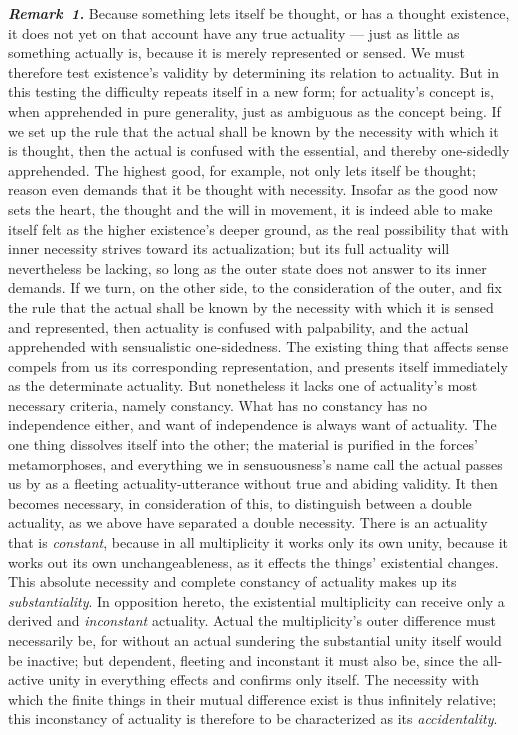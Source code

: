 \documentclass[12pt]{book}
\newcommand{\anm}[1]{\emph{\textbf{Remark~#1.}}}
\begin{document}
\anm{1} Because something lets itself be thought, or has a thought
existence, it does not yet on that account have any true actuality --- just
as little as something actually is, because it is merely represented or
sensed. We must therefore test existence's validity by determining its
relation to actuality. But in this testing the difficulty repeats itself in
a new form; for actuality's concept is, when apprehended in pure generality,
just as ambiguous as the concept being. If we set up the rule that the
actual shall be known by the necessity with which it is thought, then the
actual is confused with the essential, and thereby one-sidedly apprehended.
The highest good, for example, not only lets itself be thought; reason even
demands that it be thought with necessity. Insofar as the good now sets the
heart, the thought and the will in movement, it is indeed able to make
itself felt as the higher existence's deeper ground, as the real possibility
that with inner necessity strives toward its actualization; but its full
actuality will nevertheless be lacking, so long as the outer state does not
answer to its inner demands. If we turn, on the other side, to the
consideration of the outer, and fix the rule that the actual shall be known
by the necessity with which it is sensed and represented, then actuality is
confused with palpability, and the actual apprehended with sensualistic
one-sidedness. The existing thing that affects sense compels from us its
corresponding representation, and presents itself immediately as the
determinate actuality. But nonetheless it lacks one of actuality's most
necessary criteria, namely constancy. What has no constancy has no
independence either, and want of independence is always want of actuality.
The one thing dissolves itself into the other; the material is purified in
the forces' metamorphoses, and everything we in sensuousness's name call the
actual passes us by as a fleeting actuality-utterance without true and
abiding validity. It then becomes necessary, in consideration of this, to
distinguish between a double actuality, as we above have separated a double
necessity. There is an actuality that is \emph{constant}, because in all
multiplicity it works only its own unity, because it works out its own
unchangeableness, as it effects the things' existential changes. This
absolute necessity and complete constancy of actuality makes up its
\emph{substantiality}. In opposition hereto, the existential multiplicity
can receive only a derived and \emph{inconstant} actuality. Actual the
multiplicity's outer difference must necessarily be, for without an actual
sundering the substantial unity itself would be inactive; but dependent,
fleeting and inconstant it must also be, since the all-active unity in
everything effects and confirms only itself. The necessity with which the
finite things in their mutual difference exist is thus infinitely relative;
this inconstancy of actuality is therefore to be characterized as its
\emph{accidentality}.
\end{document}
